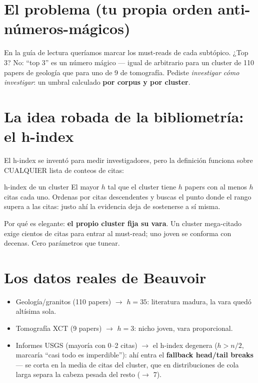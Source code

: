 \documentclass[11pt,a4paper]{article}
\begin{document}

\section{El problema (tu propia orden anti-números-mágicos)}

En la guía de lectura queríamos marcar los must-reads de cada subtópico. ¿Top 3? No:
``top 3'' es un número mágico — igual de arbitrario para un cluster de 110 papers de
geología que para uno de 9 de tomografía. Pediste \emph{investigar cómo investigar}:
un umbral calculado \textbf{por corpus y por cluster}.

\section{La idea robada de la bibliometría: el h-index}

El h-index se inventó para medir investigadores, pero la definición funciona sobre
CUALQUIER lista de conteos de citas:

\begin{concepto}{h-index de un cluster}
El mayor $h$ tal que el cluster tiene $h$ papers con al menos $h$ citas cada uno.
Ordenas por citas descendentes y buscas el punto donde el rango supera a las citas:
justo ahí la evidencia deja de sostenerse a sí misma.
\end{concepto}

Por qué es elegante: \textbf{el propio cluster fija su vara}. Un cluster mega-citado
exige cientos de citas para entrar al must-read; uno joven se conforma con decenas.
Cero parámetros que tunear.

\section{Los datos reales de Beauvoir}

\begin{itemize}
  \item Geología/granitos (110 papers) $\rightarrow$ $h = 35$: literatura madura, la
        vara quedó altísima sola.
  \item Tomografía XCT (9 papers) $\rightarrow$ $h = 3$: nicho joven, vara proporcional.
  \item Informes USGS (mayoría con 0--2 citas) $\rightarrow$ el h-index degenera
        ($h > n/2$, marcaría ``casi todo es imperdible''): ahí entra el \textbf{fallback
        head/tail breaks} — se corta en la media de citas del cluster, que en
        distribuciones de cola larga separa la cabeza pesada del resto ($\rightarrow$ 7).
\end{itemize}
\end{document}
